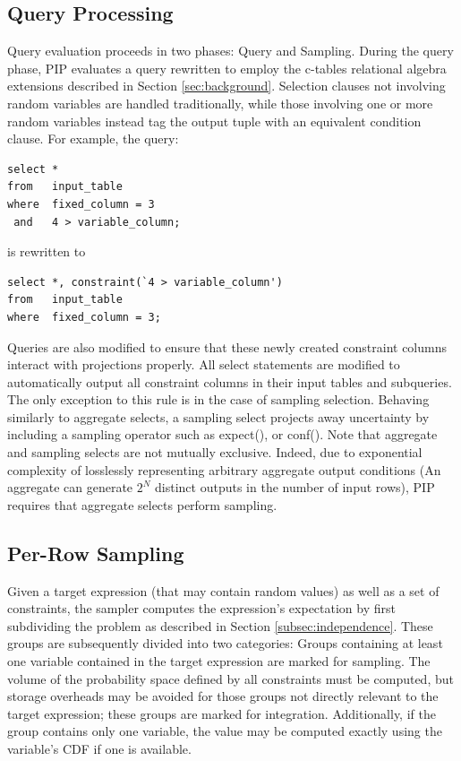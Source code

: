 \subsection{Query Processing}
Query evaluation proceeds in two phases: Query and Sampling.  During the query phase, PIP evaluates a query rewritten to employ the c-tables relational algebra extensions described in Section \ref{sec:background}.  Selection clauses not involving random variables are handled traditionally, while those involving one or more random variables instead tag the output tuple with an equivalent condition clause.  For example, the query:

\begin{verbatim}
select *
from   input_table
where  fixed_column = 3
 and   4 > variable_column;
\end{verbatim}
%
is rewritten to
%
\begin{verbatim}
select *, constraint(`4 > variable_column')
from   input_table
where  fixed_column = 3;
\end{verbatim}

Queries are also modified to ensure that these newly created constraint columns interact with projections properly.  All select statements are modified to automatically output all constraint columns in their input tables and subqueries.  The only exception to this rule is in the case of sampling selection.  Behaving similarly to aggregate selects, a sampling select projects away uncertainty by including a sampling operator such as expect(), or conf().  Note that aggregate and sampling selects are not mutually exclusive.  Indeed, due to exponential complexity of losslessly representing arbitrary aggregate output conditions (An aggregate can generate $2^{N}$ distinct outputs in the number of input rows), PIP requires that aggregate selects perform sampling. 

\subsection{Per-Row Sampling}
Given a target expression (that may contain random values) as well as a set of constraints, the sampler computes the expression's expectation by first subdividing the problem as described in Section \ref{subsec:independence}.  These groups are subsequently divided into two categories: Groups containing at least one variable contained in the target expression are marked for sampling.  The volume of the probability space defined by all constraints must be computed, but storage overheads may be avoided for those groups not directly relevant to the target expression; these groups are marked for integration.  Additionally, if the group contains only one variable, the value may be computed exactly using the variable's CDF if one is available.

